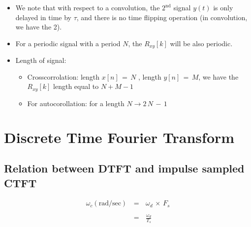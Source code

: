 \documentclass[12pt,a4paper]{book}
\begin{document}
\begin{itemize}

\item We note that with respect to a convolution, the $\mathrm{2}^\mathrm{nd}$ signal $y(t)$ is only delayed in time by $\tau$, and there is no time flipping operation (in convolution, we have the 2).

\item For a periodic signal with a period $N$, the $R_{xy}[k]$ will be also periodic.

\item Length of signal:

    \begin{itemize}
        
        \item Crosscorrolation: length $x[n] \, = \, N$ , length $y[n] \, = \, M$, we have the $R_{xy}[k]$ length equal to $N + M - 1$ 

        
        \item For autocorollation: for a length $N \rightarrow 2\, N \, - \, 1$

        
    \end{itemize}

\end{itemize}





\chapter{Discrete Time Fourier Transform}


\section{Relation between DTFT and impulse sampled CTFT}


\begin{equation}
\begin{array}{rcl}
\omega_c \left(\text{rad/sec}\right) \, &=& \, \omega_d \, \times \, F_s \\ \\
&=& \, \displaystyle\frac{\omega_d}{T_s} 
\end{array}
\end{equation}




\end{document}
